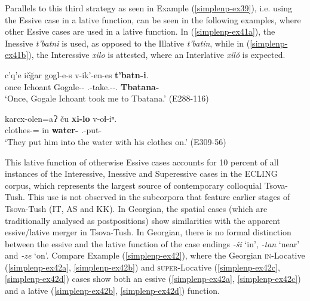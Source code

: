 Parallels to this third strategy as seen in Example (\ref{simplenp-ex39}), i.e. using the Essive case in a lative function, can be seen in the following examples, where other Essive cases are used in a lative function. In (\ref{simplenp-ex41a}), the Inessive \textit{t'batni} is used, as opposed to the Illative \textit{t'batin}, while in (\ref{simplenp-ex41b}), the Interessive \textit{xilo} is attested, where an Interlative \textit{xil\u{o}} is expected.

\begin{exe}
	\ex\label{simplenp-ex41}
	\begin{xlist}
		
		\ex\label{simplenp-ex41a}
		\gll c'q'e ič\u{g}ar gogl-e-s v-ik'-en-es \textbf{t'batn-i}. \\
		once Ichoant Gogale-{\Obl}-{\Erg} {\M}.{\Sg}-take.{\Anim}-{\Aor}-{\Fsg}.{\Erg} \textbf{Tbatana-{\Iness}} \\
		\trans `Once, Gogale Ichoant took me to Tbatana.'
		\hfill (E288-116)
		
		\ex\label{simplenp-ex41b}
		\gll karcx-olen=aɁ ču \textbf{xi-lo} v-oɬ-iⁿ. \\
		clothes-{\Adjz}={\Emph} in \textbf{water-{\Interess}} {\M}.{\Sg}-put-{\Aor} \\
		\trans `They put him into the water with his clothes on.'
		\hfill (E309-56)
		
	\end{xlist}
\end{exe}

This lative function of otherwise Essive cases accounts for 10 percent of all instances of the Interessive, Inessive and Superessive cases in the ECLING corpus, which represents the largest source of contemporary colloquial Tsova-Tush. This use is not observed in the subcorpora that feature earlier stages of Tsova-Tush (IT, AS and KK).
In Georgian, the spatial cases (which are traditionally analysed as postpositions) show similarities with the apparent essive/lative merger in Tsova-Tush. In Georgian, there is no formal distinction between the essive and the lative function of the case endings \textit{-ši} `in', \textit{-tan} `near' and \textit{-ze} `on'. Compare Example (\ref{simplenp-ex42}), where the Georgian \textsc{in}-Locative (\ref{simplenp-ex42a}, \ref{simplenp-ex42b}) and \textsc{super}-Locative (\ref{simplenp-ex42c}, \ref{simplenp-ex42d}) cases show both an essive (\ref{simplenp-ex42a}, \ref{simplenp-ex42c}) and a lative (\ref{simplenp-ex42b}, \ref{simplenp-ex42d}) function.

